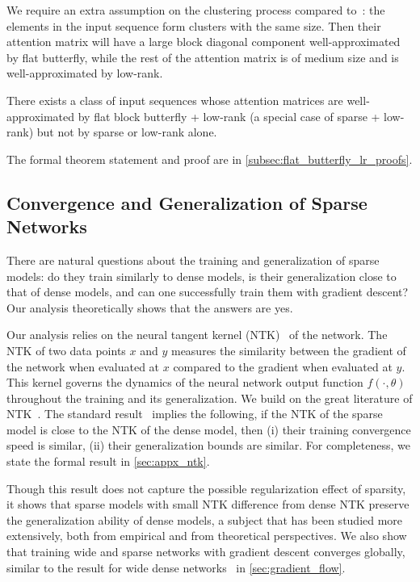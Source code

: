 We require an extra assumption on the clustering process compared
to~\citet{scatterbrain}: the elements in the input sequence form clusters with
the same size.
Then their attention matrix will have a large block diagonal component
well-approximated by flat butterfly, while the rest of the attention matrix is
of medium size and is well-approximated by low-rank.
\begin{theorem}[Informal]
  There exists a class of input sequences whose attention matrices are
  well-approximated by flat block butterfly + low-rank (a special case of sparse +
  low-rank) but not by sparse or low-rank alone.
\end{theorem}
The formal theorem statement and proof are in \cref{subsec:flat_butterfly_lr_proofs}.




\subsection{Convergence and Generalization of Sparse Networks}

There are natural questions about the training and generalization of sparse models: do they train similarly to dense models, is their generalization close to that of dense models, and can one successfully train them with gradient descent?
Our analysis theoretically shows that the answers are yes.

Our analysis relies on the neural tangent kernel (NTK)~\citep{jacot2018neural} of the network.
The NTK of two data points $x$ and $y$ measures the similarity between the gradient of the network when evaluated at $x$ compared to the gradient when evaluated at $y$.
This kernel governs the dynamics of the neural network output function $f(\cdot, \theta)$ throughout the training and its generalization.
We build on the great literature of NTK~\citep{ll18,dzps19,als19_dnn}.
The standard result~\citep{sy19} implies the following, if the NTK of the sparse model is close to the NTK of the dense model, then
(i) their training convergence speed is similar, (ii) their generalization
bounds are similar.
For completeness, we state the formal result in \cref{sec:appx_ntk}.


Though this result does not capture the possible regularization effect of sparsity, it shows that sparse models with small NTK difference from dense NTK preserve the generalization ability of dense models, a subject that has been studied more extensively, both from empirical and from theoretical perspectives.
We also show that training wide and sparse networks with gradient descent
converges globally, similar to the result for wide dense networks~\citep{dzps19,
  als19_dnn} in \cref{sec:gradient_flow}.






